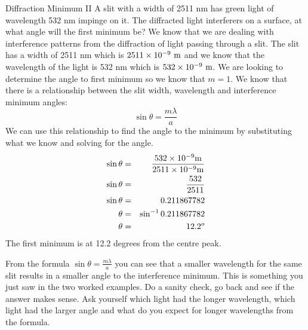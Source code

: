 \begin{wex}{Diffraction Minimum II}
{A slit with a width of 2511 nm has green light of wavelength 532 nm impinge on it. The diffracted light interferers on a surface, at what angle will the first minimum be? }
{
We know that we are dealing with interference patterns from the diffraction of light passing through a slit. The slit has a width of 2511 nm which is $2511 \times 10^{-9}\ \rm{m}$ and we know that the wavelength of the light is 532 nm which is $532 \times 10^{-9}\ \rm{m}$. We are looking to determine the angle to first minimum so we know that $m=1$.
We know that there is a relationship between the slit width, wavelength and interference minimum angles:
\begin{equation*}
\sin\theta = \frac{m\lambda}{a}
\end{equation*}
We can use this relationship to find the angle to the minimum by substituting what we know and solving for the angle.
\begin{eqnarray*}
\sin\theta &=& \frac{532\times 10^{-9}\rm{m}}{2511 \times 10^{-9}\rm{m}} \\
\sin\theta &=& \frac{532}{2511} \\
\sin\theta &=& 0.211867782  \\
\theta &=& \sin^{-1}0.211867782 \\
\theta &=& 12.2^o \\
\end{eqnarray*}
The first minimum is at 12.2 degrees from the centre peak.
}
\end{wex}

From the formula $\sin\theta = \frac{m\lambda}{a}$ you can see that a smaller wavelength for the same slit results in a smaller angle to the interference minimum. This is something you just saw in the two worked examples. Do a sanity check, go back and see if the answer makes sense. Ask yourself which light had the longer wavelength, which light had the larger angle and what do you expect for longer wavelengths from the formula.

